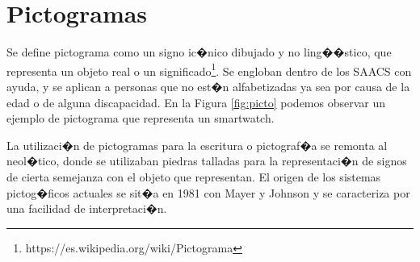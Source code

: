 \section{Pictogramas}
\label{cap2:sec:Pictogramas}

Se define pictograma como un signo ic�nico dibujado y no ling��stico, que representa un objeto real o un significado\footnote{https://es.wikipedia.org/wiki/Pictograma}.
Se engloban dentro de los SAACS con ayuda, y se aplican a personas que no est�n alfabetizadas ya sea por causa de la edad o de alguna discapacidad. En la Figura \ref{fig:picto} podemos observar un ejemplo de pictograma que representa un smartwatch.

La utilizaci�n de pictogramas para la escritura o pictograf�a se remonta al neol�tico, donde se utilizaban piedras talladas para la representaci�n de signos de cierta semejanza con el objeto que representan. El origen de los sistemas pictog�ficos actuales se sit�a en 1981 con Mayer y Johnson y se caracteriza por una facilidad de interpretaci�n. 


